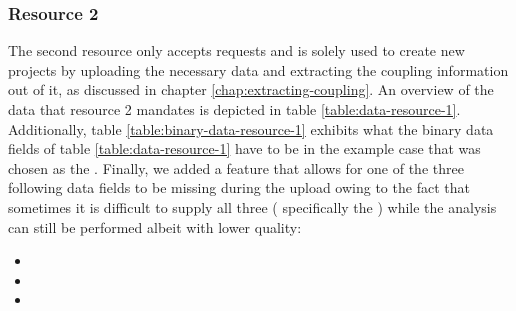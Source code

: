 \documentclass[12pt,a4paper]{report}
\begin{document}
\subsubsection{Resource 2}
The second resource only accepts 
requests and is solely used to create new projects by uploading the necessary
data and extracting the coupling information out of it, as discussed in chapter
\ref{chap:extracting-coupling}. An overview of the data that resource 2
mandates is depicted in table \ref{table:data-resource-1}. Additionally, table
\ref{table:binary-data-resource-1} exhibits what the binary data fields of
table \ref{table:data-resource-1} have to be in the example case that  was chosen as the . Finally, we added a feature
that allows for one of the three following data fields to be missing during the
upload owing to the fact that sometimes it is difficult to supply all three (
specifically the ) while the analysis can still be
performed albeit with lower quality:
\begin{itemize}[noitemsep]
  \item {}
  \item {}
  \item {}
\end{itemize}
\end{document}
